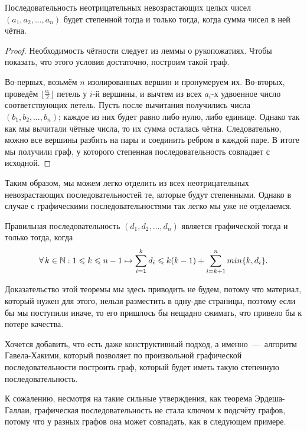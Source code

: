 \begin{statement}
	Последовательность неотрицательных невозрастающих целых чисел $(a_1, a_2, \dots, a_n)$ будет степенной тогда и только тогда, когда сумма чисел в ней чётна.
	
\begin{proof}
	Необходимость чётности следует из леммы о рукопожатиях. Чтобы показать, что этого условия достаточно, построим такой граф.
	
	Во-первых, возьмём $n$ изолированных вершин и пронумеруем их. Во-вторых, проведём $\lfloor \frac{a_i}{2} \rfloor$ петель у $i$-й вершины, и вычтем из всех $a_i$-х удвоенное число соответствующих петель. Пусть после вычитания получились числа $(b_1, b_2, \dots, b_n)$; каждое из них будет равно либо нулю, либо единице. Однако так как мы вычитали чётные числа, то их сумма осталась чётна. Следовательно, можно все вершины разбить на пары и соединить ребром в каждой паре. В итоге мы получили граф, у которого степенная последовательность совпадает с исходной.
\end{proof}\end{statement}

	Таким образом, мы можем легко отделить из всех неотрицательных невозрастающих последовательностей те, которые будут степенными. Однако в случае с графическими последовательностями так легко мы уже не отделаемся.

\begin{theorem}
	Правильная последовательность $(d_1, d_2, \dots, d_n)$ является графической тогда и только тогда, когда 
	$$\forall \!\ k \in \mathbb{N}: 1 \leqslant k \leqslant n-1 \mapsto \sum_{i=1}^k d_i \leqslant k(k-1) + \sum_{i=k+1}^n min \lbrace k, d_i \rbrace. $$
\end{theorem}

	Доказательство этой теоремы мы здесь приводить не будем, потому что материал, который нужен для этого, нельзя разместить в одну-две страницы, поэтому если бы мы поступили иначе, то его пришлось бы нещадно сжимать, что привело бы к потере качества.

	Хочется добавить, что есть даже конструктивный подход, а именно~---~алгоритм Гавела-Хакими, который позволяет по произвольной графической последовательности построить граф, который будет иметь такую степенную последовательность.

	К сожалению, несмотря на такие сильные утверждения, как теорема Эрдеша-Галлаи, графическая последовательность не стала ключом к подсчёту графов, потому что у разных графов она может совпадать, как в следующем примере.
	
